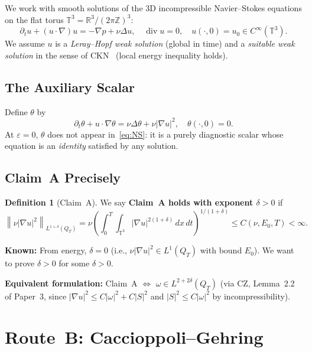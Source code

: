 \documentclass[11pt]{article}
\theoremstyle{definition}
\newtheorem{definition}[theorem]{Definition}
\theoremstyle{remark}
\newcommand{\R}{\mathbb{R}}
\newcommand{\Z}{\mathbb{Z}}
\newcommand{\T}{\mathbb{T}}
\newcommand{\norm}[1]{\left\|#1\right\|}
\newcommand{\prt}{\partial_t}
\newcommand{\grad}{\nabla}
\newcommand{\divg}{\operatorname{div}}
\newcommand{\dx}{\,dx}
\newcommand{\dt}{\,dt}
\begin{document}
We work with smooth solutions of the 3D incompressible Navier--Stokes equations
on the flat torus $\T^3 = \R^3/(2\pi\Z)^3$:
\begin{equation}\label{eq:NS}
  \prt u + (u\cdot\grad)u = -\grad p + \nu\Delta u,
  \quad \divg u = 0,
  \quad u(\cdot,0)=u_0\in C^\infty(\T^3).
\end{equation}
We assume $u$ is a \emph{Leray--Hopf weak solution} (global in time) and
a \emph{suitable weak solution} in the sense of CKN~\cite{CKN1982}
(local energy inequality holds).

\subsection{The Auxiliary Scalar}

Define $\theta$ by
\begin{equation}\label{eq:theta}
  \prt\theta + u\cdot\grad\theta = \nu\Delta\theta + \nu|\grad u|^2,
  \quad \theta(\cdot,0) = 0.
\end{equation}
At $\varepsilon=0$, $\theta$ does not appear in~\eqref{eq:NS}: it is a
purely diagnostic scalar whose equation is an \emph{identity} satisfied
by any solution.

\subsection{Claim~A Precisely}

\begin{definition}[Claim~A]\label{def:claimA}
  We say \textbf{Claim~A holds with exponent $\delta>0$} if
  \[
    \norm{\nu|\grad u|^2}_{L^{1+\delta}(Q_T)}
    = \nu\left(\int_0^T\!\!\int_{\T^3}|\grad u|^{2(1+\delta)}\dx\dt\right)^{1/(1+\delta)}
    \leq C(\nu,E_0,T) < \infty.
  \]
\end{definition}

\textbf{Known:} From energy, $\delta=0$ (i.e., $\nu|\grad u|^2\in L^1(Q_T)$
with bound $E_0$). We want to prove $\delta>0$ for some $\delta>0$.

\textbf{Equivalent formulation:} Claim~A $\Leftrightarrow$ $\omega\in L^{2+2\delta}(Q_T)$
(via CZ, Lemma~2.2 of Paper~3, since $|\grad u|^2 \leq C|\omega|^2 + C|S|^2$
and $|S|^2\leq C|\omega|^2$ by incompressibility).

\section{Route~B: Caccioppoli--Gehring}
\label{sec:routeB}
\end{document}
